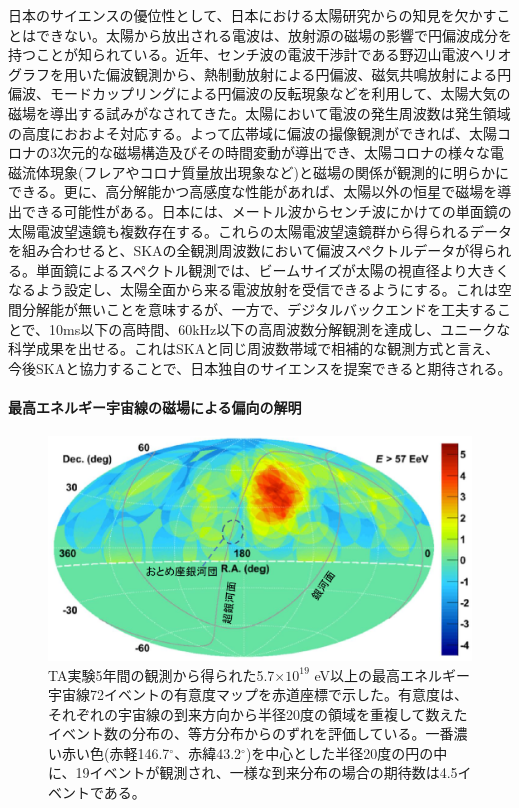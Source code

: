 日本のサイエンスの優位性として、日本における太陽研究からの知見を欠かすことはできない。太陽から放出される電波は、放射源の磁場の影響で円偏波成分を持つことが知られている。近年、センチ波の電波干渉計である野辺山電波ヘリオグラフを用いた偏波観測から、熱制動放射による円偏波、磁気共鳴放射による円偏波、モードカップリングによる円偏波の反転現象などを利用して、太陽大気の磁場を導出する試みがなされてきた\citep{2013PASJ...65S..14I}。太陽において電波の発生周波数は発生領域の高度におおよそ対応する。よって広帯域に偏波の撮像観測ができれば、太陽コロナの3次元的な磁場構造及びその時間変動が導出でき、太陽コロナの様々な電磁流体現象(フレアやコロナ質量放出現象など)と磁場の関係が観測的に明らかにできる。更に、高分解能かつ高感度な性能があれば、太陽以外の恒星で磁場を導出できる可能性がある。日本には、メートル波からセンチ波にかけての単面鏡の太陽電波望遠鏡も複数存在する。これらの太陽電波望遠鏡群から得られるデータを組み合わせると、SKAの全観測周波数において偏波スペクトルデータが得られる。単面鏡によるスペクトル観測では、ビームサイズが太陽の視直径より大きくなるよう設定し、太陽全面から来る電波放射を受信できるようにする。これは空間分解能が無いことを意味するが、一方で、デジタルバックエンドを工夫することで、10ms以下の高時間、60kHz以下の高周波数分解観測を達成し、ユニークな科学成果を出せる。これはSKAと同じ周波数帯域で相補的な観測方式と言え、今後SKAと協力することで、日本独自のサイエンスを提案できると期待される。

\paragraph{最高エネルギー宇宙線の磁場による偏向の解明}

\begin{figure}[tbp]
\begin{center}
\includegraphics[width=0.8\linewidth]{magnetism/c06.s3.ss13.f1.eps}
\end{center}
\caption{TA実験5年間の観測から得られた5.7$\times 10^{19}$ eV以上の最高エネルギー宇宙線72イベントの有意度マップを赤道座標で示した。有意度は、それぞれの宇宙線の到来方向から半径20度の領域を重複して数えたイベント数の分布の、等方分布からのずれを評価している。一番濃い赤い色(赤軽146.7$^{\circ}$、赤緯43.2$^{\circ}$)を中心とした半径20度の円の中に、19イベントが観測され、一様な到来分布の場合の期待数は4.5イベントである。
}\label{c06.s3.ss13.f1}
\end{figure}

